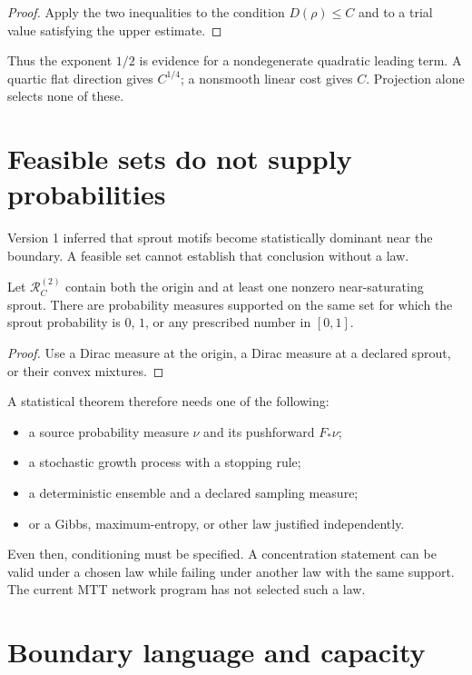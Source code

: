 \documentclass[11pt]{article}
\newcommand{\Image}{\mathcal R}
\begin{document}
\begin{proof}
Apply the two inequalities to the condition $D(\rho)\leq C$ and to a trial
value satisfying the upper estimate.
\end{proof}

Thus the exponent $1/2$ is evidence for a nondegenerate quadratic leading
term.  A quartic flat direction gives $C^{1/4}$; a nonsmooth linear cost
gives $C$.  Projection alone selects none of these.

\section{Feasible sets do not supply probabilities}

Version 1 inferred that sprout motifs become statistically dominant near the
boundary.  A feasible set cannot establish that conclusion without a law.

\begin{proposition}
Let $\Image_C^{(2)}$ contain both the origin and at least one nonzero
near-saturating sprout.  There are probability measures supported on the
same set for which the sprout probability is $0$, $1$, or any prescribed
number in $[0,1]$.
\end{proposition}

\begin{proof}
Use a Dirac measure at the origin, a Dirac measure at a declared sprout, or
their convex mixtures.
\end{proof}

A statistical theorem therefore needs one of the following:

\begin{itemize}
\item a source probability measure $\nu$ and its pushforward $F_\ast\nu$;
\item a stochastic growth process with a stopping rule;
\item a deterministic ensemble and a declared sampling measure;
\item or a Gibbs, maximum-entropy, or other law justified independently.
\end{itemize}

Even then, conditioning must be specified.  A concentration statement can
be valid under a chosen law while failing under another law with the same
support.  The current MTT network program has not selected such a law.

\section{Boundary language and capacity}
\end{document}
